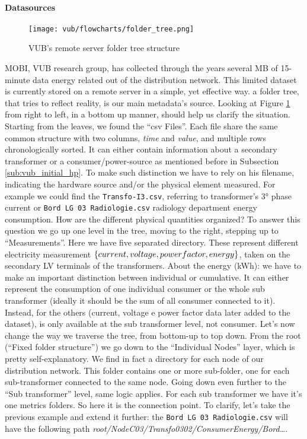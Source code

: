 \paragraph{Datasources}
\begin{figure}[ht]
    \texttt{[image: vub/flowcharts/folder\_tree.png]}
    \caption{\ac{VUB}'s remote server folder tree structure}
    \label{fig:vub_folder_tree}
\end{figure}
MOBI, \ac{VUB} research group, has collected through the years several MB of 15-minute data energy related out of the distribution network.
This limited dataset is currently stored on a remote server in a simple, yet effective way. 
a folder tree, that tries to reflect reality, is our main metadata's source. 
Looking at Figure \ref{fig:vub_folder_tree} from right to left, in a bottom up manner, should help us clarify the situation. %
Starting from the leaves, we found the ``\ac{csv} Files''. Each file share the same common structure with two columns, \textit{time} and \textit{value}, and multiple rows chronologically sorted.
It can either contain information about a secondary transformer or a consumer/power-source as mentioned before in Subsection \ref{sub:vub_initial_hp}. 
To make such distinction we have to rely on his filename, indicating the hardware source and/or the physical element measured.
For example we could find the \texttt{Transfo-I3.csv}, referring to transformer's 3° phase current or \texttt{Bord LG 03 Radiologie.csv} radiology department energy consumption.
How are the different physical quantities organized? To answer this question we go up one level in the tree, moving to the right, stepping up to ``Measurements''. 
Here we have five separated directory. These represent different electricity measurement $\{current, voltage, power\-factor, energy\}$, taken on the secondary \ac{LV} terminals of the transformers. 
About the energy (kWh): we have to make an important distinction between individual or cumulative. It can either represent the consumption of one individual consumer or the whole sub transformer 
(ideally it should be the sum of all consumer connected to it).
Instead, for the others (current, voltage e power factor data later added to the dataset), is only available at the sub transformer level, not consumer. Let's now change the way we traverse the tree, from bottom-up to top down.
From the root (``Fixed folder structure'') we go down to the ``Individual Nodes'' layer, which is pretty self-explanatory. We find in fact a directory for each node of our distribution network. 
This folder contains one or more sub-folder, one for each sub-transformer connected to the same node. Going down even further to the ``Sub transformer'' level, same logic applies. For each sub transformer we have it's one metrics folders.
So here it is the connection point.
To clarify, let's take the previous example and extend it further: the \texttt{Bord LG 03 Radiologie.csv} will have the following path \textit{root/NodeC03/Transfo0302/ConsumerEnergy/Bord\dots}.

